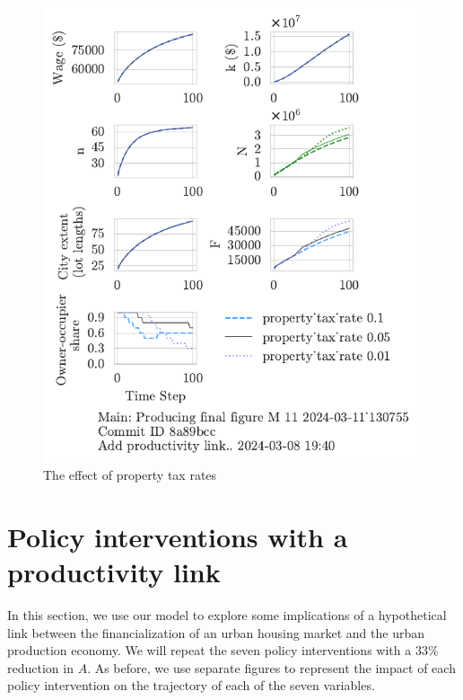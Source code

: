 \begin{figure}[h!tb]
    \centering
    \includegraphics[scale=1.1, trim={0 1.4cm 0 0},clip]{fig/property_tax_rate-Main-130755.pdf}
    \caption{The effect of property tax rates}
    \label{fig:property_tax_ownership_trajectory}
\end{figure}

\newpage
\section{Policy interventions with a productivity link}

In this section, we use our model to explore some implications of a hypothetical link between the financialization of an urban housing market and the urban production economy. 
We will repeat the seven policy interventions with a 33\% reduction in $A$.  As before, we use separate figures to represent the impact of each policy intervention on the trajectory of each of the seven variables. 

